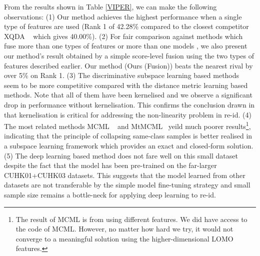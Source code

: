 \documentclass[10pt,twocolumn,letterpaper]{article}
\begin{document}
From the results shown in Table \ref{VIPER}, we can make the following observations: (1) Our method achieves the highest performance when a single type of features are used (Rank 1 of 42.28\% compared to the closest competitor XQDA ~\cite{liao2015person} which gives 40.00\%). (2) For fair comparison against methods which fuse more than one types of features \cite{paisitkriangkrailearning} or more than one models \cite{zhao2014learning}, we also present our method's result obtained by a simple score-level fusion using the two types of features described earlier. Our method (Ours (Fusion)) beats the nearest rival \cite{paisitkriangkrailearning} by over 5\% on Rank 1. (3) The discriminative subspace learning based methods seem to be more competitive compared with the distance metric learning based methods. Note that all of them have been kernelised and we observe a significant drop in performance without kernelisation. This confirms the conclusion drawn in \cite{xiong2014person} that kernelisation is critical for addressing the non-linearity problem in re-id.  (4) The most related methods MCML ~\cite{MCML_GlobersonR05} and MtMCML~\cite{ma2014person} yeild much poorer results\footnote{The result of MCML is from \cite{ma2014person} using different features. We did have access to the code of MCML. However, no matter how hard we try, it would not converge to a meaningful solution using the higher-dimensional LOMO features. }, indicating that the principle of collapsing same-class samples is better realised in a subspace learning framework which provides an exact and closed-form solution. (5) The deep learning based method \cite{ahmed2015improved} does not fare well on this small dataset despite the fact that the model has been pre-trained on the far-larger CUHK01+CUHK03 datasets. This suggests that the model learned from other datasets are not transferable by the simple model fine-tuning strategy and small sample size remains a bottle-neck for applying deep learning to re-id.  
\end{document}
